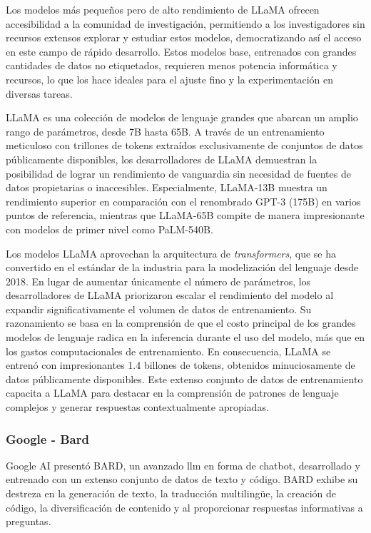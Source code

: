 Los modelos más pequeños pero de alto rendimiento de LLaMA ofrecen accesibilidad a la comunidad de investigación, permitiendo a los investigadores sin recursos extensos explorar y estudiar estos modelos, democratizando así el acceso en este campo de rápido desarrollo. Estos modelos base, entrenados con grandes cantidades de datos no etiquetados, requieren menos potencia informática y recursos, lo que los hace ideales para el ajuste fino y la experimentación en diversas tareas.

LLaMA es una colección de modelos de lenguaje grandes que abarcan un amplio rango de parámetros, desde 7B hasta 65B. A través de un entrenamiento meticuloso con trillones de tokens extraídos exclusivamente de conjuntos de datos públicamente disponibles, los desarrolladores de LLaMA demuestran la posibilidad de lograr un rendimiento de vanguardia sin necesidad de fuentes de datos propietarias o inaccesibles. Especialmente, LLaMA-13B muestra un rendimiento superior en comparación con el renombrado GPT-3 (175B) en varios puntos de referencia, mientras que LLaMA-65B compite de manera impresionante con modelos de primer nivel como PaLM-540B\cite{Murtuza}.


Los modelos LLaMA aprovechan la arquitectura de \textit{transformers}, que se ha convertido en el estándar de la industria para la modelización del lenguaje desde 2018. En lugar de aumentar únicamente el número de parámetros, los desarrolladores de LLaMA priorizaron escalar el rendimiento del modelo al expandir significativamente el volumen de datos de entrenamiento. Su razonamiento se basa en la comprensión de que el costo principal de los grandes modelos de lenguaje radica en la inferencia durante el uso del modelo, más que en los gastos computacionales de entrenamiento. En consecuencia, LLaMA se entrenó con impresionantes 1.4 billones de tokens, obtenidos minuciosamente de datos públicamente disponibles. Este extenso conjunto de datos de entrenamiento capacita a LLaMA para destacar en la comprensión de patrones de lenguaje complejos y generar respuestas contextualmente apropiadas.

\subsubsection{Google - Bard}

Google AI presentó BARD, un avanzado \acrfull{llm} en forma de chatbot, desarrollado y entrenado con un extenso conjunto de datos de texto y código. BARD exhibe su destreza en la generación de texto, la traducción multilingüe, la creación de código, la diversificación de contenido y al proporcionar respuestas informativas a preguntas.

